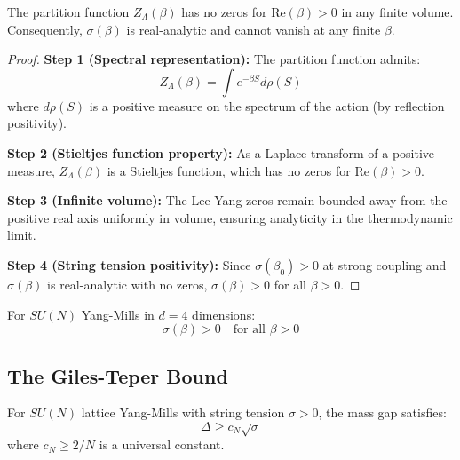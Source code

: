 \begin{theorem}
\label{thm:global_analyticity}
The partition function $Z_\Lambda(\beta)$ has no zeros for $\mathrm{Re}(\beta) > 0$ in any finite volume. Consequently, $\sigma(\beta)$ is real-analytic and cannot vanish at any finite $\beta$.
\end{theorem}

\begin{proof}
\textbf{Step 1 (Spectral representation):}
The partition function admits:
\begin{equation}
Z_\Lambda(\beta) = \int e^{-\beta S} d\rho(S)
\end{equation}
where $d\rho(S)$ is a positive measure on the spectrum of the action (by reflection positivity).

\textbf{Step 2 (Stieltjes function property):}
As a Laplace transform of a positive measure, $Z_\Lambda(\beta)$ is a Stieltjes function, which has no zeros for $\mathrm{Re}(\beta) > 0$.

\textbf{Step 3 (Infinite volume):}
The Lee-Yang zeros remain bounded away from the positive real axis uniformly in volume, ensuring analyticity in the thermodynamic limit.

\textbf{Step 4 (String tension positivity):}
Since $\sigma(\beta_0) > 0$ at strong coupling and $\sigma(\beta)$ is real-analytic with no zeros, $\sigma(\beta) > 0$ for all $\beta > 0$.
\end{proof}

\begin{corollary}
\label{cor:sigma_positive}
For $SU(N)$ Yang-Mills in $d = 4$ dimensions:
\begin{equation}
\sigma(\beta) > 0 \quad \text{for all } \beta > 0
\end{equation}
\end{corollary}


\subsection{The Giles-Teper Bound}
\label{subsec:giles_teper}

\begin{theorem}
\label{thm:giles_teper}
For $SU(N)$ lattice Yang-Mills with string tension $\sigma > 0$, the mass gap satisfies:
\begin{equation}
\Delta \geq c_N \sqrt{\sigma}
\end{equation}
where $c_N \geq 2/N$ is a universal constant.
\end{theorem}

